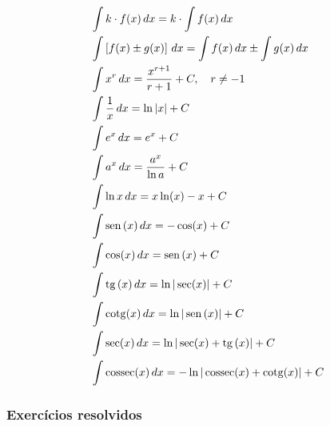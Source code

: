 \cleardoublepage\documentclass[../main.tex]{subfiles}
\begin{document}
\begin{small}
\begin{align}
  & \int k\cdot f(x)\,dx = k\cdot\int f(x)\,dx\\
  & \int \left[f(x)\pm g(x)\right]\,dx = \int f(x)\,dx \pm \int g(x)\,dx\\
  & \int x^r\,dx = \frac{x^{r+1}}{r+1} + C,\quad r\neq -1\\
  & \int \frac{1}{x}\,dx = \ln |x| + C \\
  & \int e^x\,dx = e^x + C \\
  & \int a^x\,dx = \frac{a^x}{\ln a} + C \\
  & \int \ln x \,dx = x\ln(x) - x + C \\
  & \int \operatorname{sen}\,(x)\,dx = -\cos(x) + C \\
  & \int \cos(x)\,dx = \operatorname{sen}\,(x) + C \\
  & \int \operatorname{tg}\,(x)\,dx = \ln|\sec(x)| + C \\
  & \int \operatorname{cotg}(x)\,dx = \ln|\operatorname{sen}\,(x)| + C \\
  & \int \sec(x)\,dx = \ln|\sec(x)+\operatorname{tg}\,(x)| + C \\
  & \int \operatorname{cossec}(x)\,dx = -\ln|\operatorname{cossec}(x)+\operatorname{cotg}(x)| + C
\end{align}
\end{small}
\subsubsection{Exercícios resolvidos}
\end{document}
